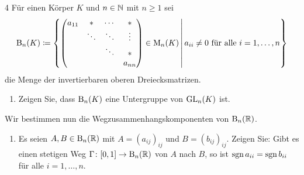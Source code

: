 \begin{question}[subtitle = Die Wegzusammenhangskomponenten der oberen Dreiecksmatrizen]{4}
  Für einen Körper $K$ und $n \in \mathbb{N}$ mit $n \geq 1$ sei
  \[
    \operatorname{B}_n(K)
    \coloneqq
    \left\{
      \begin{pmatrix}
        a_{11}  & *       & \cdots  & *       \\
                & \ddots  & \ddots  & \vdots  \\
                &         & \ddots  & *       \\
                &         &         & a_{nn}
      \end{pmatrix}
      \in \operatorname{M}_n(K)
      \,\middle|\,
      \text{$a_{ii} \neq 0$ für alle $i = 1, \dotsc, n$}
    \right\}
  \]
  die Menge der invertierbaren oberen Dreiecksmatrizen.
  \begin{enumerate}[leftmargin=*]
    \item
      Zeigen Sie, dass $\operatorname{B}_n(K)$ eine Untergruppe von $\operatorname{GL}_n(K)$ ist.
  \end{enumerate}
  Wir bestimmen nun die Wegzusammenhangskomponenten von $\operatorname{B}_n(\mathbb{R})$.
  \begin{enumerate}[leftmargin=*, resume]
    \item
      Es seien $A, B \in \operatorname{B}_n(\mathbb{R})$ mit $A = (a_{ij})_{ij}$ und $B = (b_{ij})_{ij}$.
      Zeigen Sie:
      Gibt es einen stetigen Weg $\Gamma \colon [0,1] \to \operatorname{B}_n(\mathbb{R})$ von $A$ nach $B$, so ist $\operatorname{sgn} a_{ii} = \operatorname{sgn} b_{ii}$ für alle $i = 1, \dotsc, n$.
      

\end{enumerate}
\end{question}
